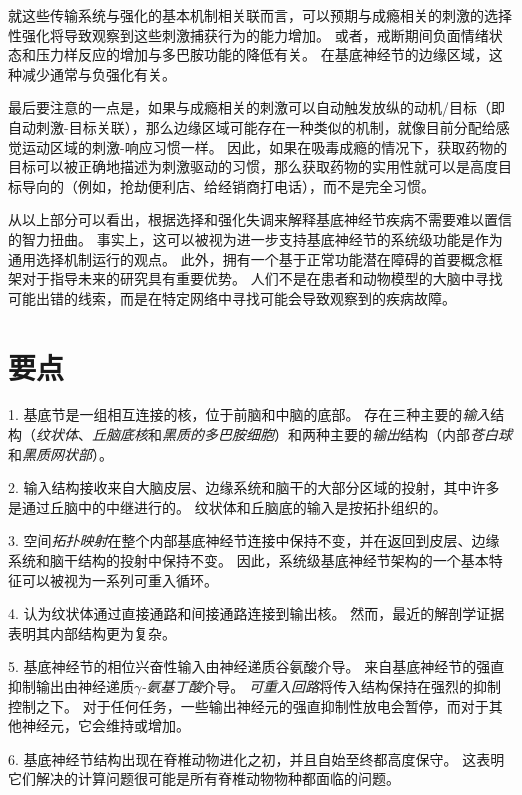 就这些传输系统与强化的基本机制相关联而言，可以预期与成瘾相关的刺激的选择性强化将导致观察到这些刺激捕获行为的能力增加。
或者，戒断期间负面情绪状态和压力样反应的增加与多巴胺功能的降低有关。
在基底神经节的边缘区域，这种减少通常与负强化有关。


最后要注意的一点是，如果与成瘾相关的刺激可以自动触发放纵的动机/目标（即自动刺激-目标关联），那么边缘区域可能存在一种类似的机制，就像目前分配给感觉运动区域的刺激-响应习惯一样。
因此，如果在吸毒成瘾的情况下，获取药物的目标可以被正确地描述为刺激驱动的习惯，那么获取药物的实用性就可以是高度目标导向的（例如，抢劫便利店、给经销商打电话），而不是完全习惯。


从以上部分可以看出，根据选择和强化失调来解释基底神经节疾病不需要难以置信的智力扭曲。
事实上，这可以被视为进一步支持基底神经节的系统级功能是作为通用选择机制运行的观点。
此外，拥有一个基于正常功能潜在障碍的首要概念框架对于指导未来的研究具有重要优势。
人们不是在患者和动物模型的大脑中寻找可能出错的线索，而是在特定网络中寻找可能会导致观察到的疾病故障。



\section{要点}

1. 基底节是一组相互连接的核，位于前脑和中脑的底部。
存在三种主要的\textit{输入}结构（\textit{纹状体}、\textit{丘脑底核}和\textit{黑质的多巴胺细胞}）和两种主要的\textit{输出}结构（内部\textit{苍白球}和\textit{黑质网状部}）。


2. 输入结构接收来自大脑皮层、边缘系统和脑干的大部分区域的投射，其中许多是通过丘脑中的中继进行的。
纹状体和丘脑底的输入是按拓扑组织的。


3. 空间\textit{拓扑映射}在整个内部基底神经节连接中保持不变，并在返回到皮层、边缘系统和脑干结构的投射中保持不变。
因此，系统级基底神经节架构的一个基本特征可以被视为一系列可重入循环。


4. 认为纹状体通过直接通路和间接通路连接到输出核。
然而，最近的解剖学证据表明其内部结构更为复杂。


5. 基底神经节的相位兴奋性输入由神经递质谷氨酸介导。
来自基底神经节的强直抑制输出由神经递质\textit{$\gamma$-氨基丁酸}介导。
\textit{可重入回路}将传入结构保持在强烈的抑制控制之下。
对于任何任务，一些输出神经元的强直抑制性放电会暂停，而对于其他神经元，它会维持或增加。


6. 基底神经节结构出现在脊椎动物进化之初，并且自始至终都高度保守。
这表明它们解决的计算问题很可能是所有脊椎动物物种都面临的问题。


